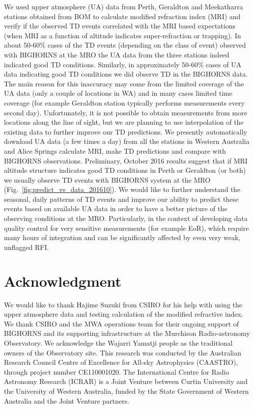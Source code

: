 \documentclass{article}
\begin{document}
We used upper atmosphere (UA) data from Perth, Geraldton and Meekatharra stations obtained from BOM to calculate modified refraction index (MRI) and verify if the observed TD events correlated with the MRI based expectations (when MRI as a function of altitude indicates super-refraction or trapping).
In about 50-60\% cases of the TD events (depending on the class of event) observed with BIGHORNS at the MRO the UA data from the three stations indeed indicated good TD conditions.
Similarly, in approximately 50-60\% cases of UA data indicating good TD conditions we did observe TD in the BIGHORNS data. 
The main reason for this inaccuracy may come from the limited coverage of the UA data (only a couple of locations in WA) and in many cases limited time coverage (for example Geraldton station typically performs measurements every second day).
Unfortunately, it is not possible to obtain measurements from more locations along the line of sight, but we are planning to use interpolation of the existing data to further improve our TD predictions.
We presently automatically download UA data (a few times a day) from all the stations in Western Australia and Alice Springs calculate MRI, make TD predictions and compare with BIGHORNS observations. 
Preliminary, October 2016 results suggest that if MRI altitude structure indicates good TD conditions in Perth or Geraldton (or both) we usually observe TD events with BIGHORNS system at the MRO (Fig.~\ref{fig:predict_vs_data_201610}). 
We would like to further understand the seasonal, daily patterns of TD events and improve our ability to predict these events based on available UA data in order to have a better picture of the observing conditions at the MRO.
Particularly, in the context of developing data quality control for very sensitive measurements (for example EoR), which require many hours of integration and can be significantly affected by even very weak, unflagged RFI.


\section{Acknowledgment}
We would like to thank Hajime Suzuki from CSIRO for his help with using the upper atmosphere data and testing calculation of the modified refractive index.
We thank CSIRO and the MWA operations team for their ongoing support of BIGHORNS and its supporting infrastructure at the Murchison Radio-astronomy Observatory. We acknowledge the Wajarri Yamatji people as the traditional owners of the Observatory site.
This research was conducted by the Australian Research Council Centre of Excellence for All-sky Astrophysics (CAASTRO), through project number CE110001020.
The International Centre for Radio Astronomy Research (ICRAR) is a Joint Venture between Curtin University and the University of Western Australia, funded by the State Government of Western Australia and the Joint Venture partners.
\end{document}
